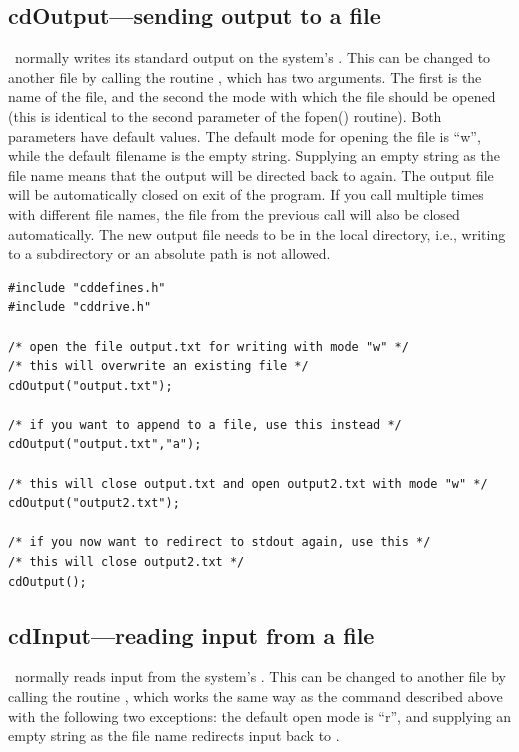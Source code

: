 \subsection{cdOutput---sending output to a file}

\Cloudy\ normally writes its standard output on the system's
. This can be changed to another file by calling the
routine , which has two arguments. The first is the name
of the file, and the second the mode with which the file should be opened
(this is identical to the second parameter of the fopen() routine). Both
parameters have default values. The default mode for opening the file is
``w'', while the default filename is the empty string. Supplying an empty
string as the file name means that the output will be directed back to
 again. The output file will be automatically closed on
exit of the program. If you call  multiple times with
different file names, the file from the previous call will also be closed
automatically. The new output file needs to be in the local directory, i.e.,
writing to a subdirectory or an absolute path is not allowed.
\begin{verbatim}
#include "cddefines.h"
#include "cddrive.h"

/* open the file output.txt for writing with mode "w" */
/* this will overwrite an existing file */
cdOutput("output.txt");

/* if you want to append to a file, use this instead */
cdOutput("output.txt","a");

/* this will close output.txt and open output2.txt with mode "w" */
cdOutput("output2.txt");

/* if you now want to redirect to stdout again, use this */
/* this will close output2.txt */
cdOutput();
\end{verbatim}

\subsection{cdInput---reading input from a file}

\Cloudy\ normally reads input from the system's . This can
be changed to another file by calling the routine , which
works the same way as the  command described above with
the following two exceptions: the default open mode is ``r'', and supplying
an empty string as the file name redirects input back to .

